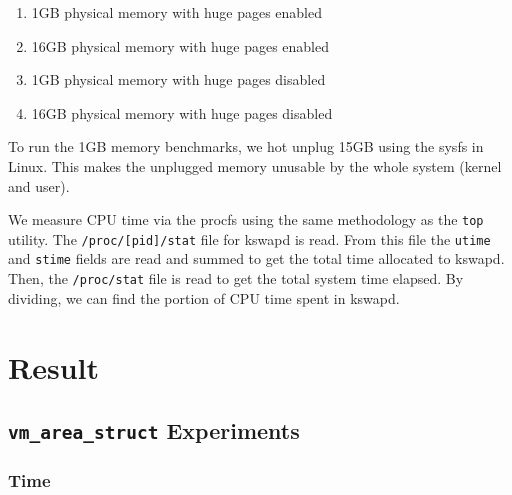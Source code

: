 \documentclass[twocolumn,11pt]{article}
\begin{document}
\begin{enumerate}
    \item 1GB physical memory with huge pages enabled
    \item 16GB physical memory with huge pages enabled
    \item 1GB physical memory with huge pages disabled
    \item 16GB physical memory with huge pages disabled
\end{enumerate}

To run the 1GB memory benchmarks, we hot unplug 15GB using the sysfs in Linux.
This makes the unplugged memory unusable by the whole system (kernel and user).

We measure CPU time via the procfs using the same methodology as the
\texttt{top} utility. The \texttt{/proc/[pid]/stat} file for kswapd is read.
From this file the \texttt{utime} and \texttt{stime} fields are read and summed
to get the total time allocated to kswapd. Then, the \texttt{/proc/stat} file is
read to get the total system time elapsed. By dividing, we can find the portion
of CPU time spent in kswapd.

\section{Result}

\subsection{\texttt{vm\_area\_struct} Experiments}

\subsubsection{Time}
\end{document}
